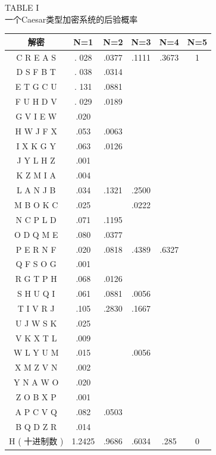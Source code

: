 \documentclass[]{article}
\begin{document}
\begin{center}
	{TABLE I\\一个Caesar类型加密系统的后验概率}
	\begin{tabular}{|c|c|c|c|c|c|}
		\hline 
		解密& N=1 & N=2 & N=3 & N=4 & N=5  \\ 
		\hline 
		C R E A S& . 028 & .0377 & .1111 & .3673 & 1 \\ 
		\hline 
		D S F B T& . 038 & .0314 &  &  &  \\ 
		\hline 
		E T G C U& . 131 & .0881 &  &  &  \\ 
		\hline 
		F U H D V& . 029 & .0189 &  &  &  \\ 
		\hline 
		G V I E W& .020  &  &  &  &  \\ 
		\hline 
		H W J F X& .053 & .0063 &  &  &  \\ 
		\hline 
		I X K G Y& .063 & .0126 &  &  &  \\ 
		\hline 
		J Y L H Z& .001 &  &  &  &  \\ 
		\hline 
		K Z M I A& .004 &  &  &  &  \\ 
		\hline 
		L A N J B& .034 & .1321 & .2500 &  &  \\ 
		\hline 
		M B O K C& .025 &  & .0222 &  &  \\ 
		\hline 
		N C P L D& .071 & .1195 &  &  &  \\ 
		\hline 
		O D Q M E& .080 & .0377 &  &  &  \\ 
		\hline 
		P E R N F& .020 & .0818 & .4389 & .6327 &  \\ 
		\hline 
		Q F S O G& .001 &  &  &  &  \\ 
		\hline 
		R G T P H& .068 & .0126 &  &  &  \\ 
		\hline 
		S H U Q I& .061 & .0881 & .0056 &  &  \\ 
		\hline 
		T I V R J& .105 & .2830 & .1667 &  &  \\ 
		\hline 
		U J W S K& .025 &  &  &  &  \\ 
		\hline 
		V K X T L& .009 &  &  &  &  \\ 
		\hline 
		W L Y U M& .015 &  & .0056 &  &  \\ 
		\hline 
		X M Z V N& .002 &  &  &  &  \\ 
		\hline 
		Y N A W O& .020 &  &  &  &  \\ 
		\hline 
		Z O B X P& .001 &  &  &  &  \\ 
		\hline 
		A P C V Q& .082 & .0503 &  &  &  \\ 
		\hline 
		B Q D Z R& .014 &  &  &  &  \\ 
		\hline 
		H ( 十进制数 )& 1.2425 & .9686 & .6034 & .285 & 0 \\ 
		\hline 
	\end{tabular} 
\end{center}
\end{document}
